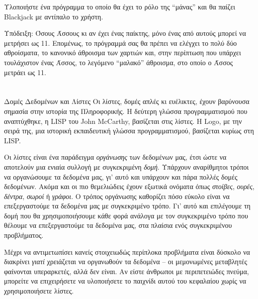 \documentclass[a4paper,11pt,oneside]{book}
\begin{document}
\begin{exercise}
Υλοποιήστε ένα πρόγραμμα το οποίο θα έχει το ρόλο της ``μάνας'' και θα παίζει Blackjack με αντίπαλο το χρήστη.

\begin{note}
Υπόδειξη: Όσους Άσσους κι αν έχει ένας παίκτης, μόνο ένας από αυτούς μπορεί να μετρήσει ως 11. Επομένως, το πρόγραμμά σας θα πρέπει να ελέγχει το πολύ δύο αθροίσματα, το κανονικό άθροισμα των χαρτιών και, στην περίπτωση που υπάρχει τουλάχιστον ένας Άσσος, το λεγόμενο ``μαλακό'' άθροισμα, στο οποίο ο Άσσος μετράει ως 11.
\end{note}
\end{exercise}


\section*{}
\vspace{2\parskip}
\hrulefill

\begin{theory}{Δομές Δεδομένων και Λίστες}
Οι λίστες, δομές απλές κι ευέλικτες, έχουν βαρύνουσα σημασία στην ιστορία της Πληροφορικής. Η δεύτερη γλώσσα προγραμματισμού που αναπτύχθηκε, η LISP του John McCarthy, βασίζεται στις λίστες. Η Logo, με την σειρά της, μια ιστορική εκπαιδευτική γλώσσα προγραμματισμού, βασίζεται κυρίως στη LISP.

Οι λίστες είναι ένα παράδειγμα \emph{οργάνωσης} των δεδομένων μας, έτσι ώστε να αποτελούν μια ενιαία συλλογή με συγκεκριμένη \emph{δομή}. Υπάρχουν αναρίθμητοι τρόποι να οργανώσουμε τα δεδομένα μας, γι' αυτό και υπάρχουν και πάρα πολλές δομές δεδομένων. Ακόμα και οι πιο θεμελιώδεις έχουν εξωτικά ονόματα όπως \emph{στοίβες}, \emph{ουρές}, \emph{δέντρα}, \emph{σωροί} ή \emph{γράφοι}. Ο τρόπος οργάνωσης καθορίζει πόσο εύκολο είναι να επεξεργαστούμε τα δεδομένα μας με συγκεκριμένο τρόπο. Γι' αυτό και επιλέγουμε τη δομή που θα χρησιμοποιήσουμε κάθε φορά ανάλογα με τον συγκεκριμένο τρόπο που θέλουμε να επεξεργαστούμε τα δεδομένα μας, στα πλαίσια ενός συγκεκριμένου προβλήματος.

Μέχρι να αντιμετωπίσει κανείς στοιχειωδώς περίπλοκα προβλήματα είναι δύσκολο να διακρίνει \emph{γιατί} χρειάζεται να οργανωθούν τα δεδομένα -- οι μεμονωμένες μεταβλητές φαίνονται υπεραρκετές, αλλά δεν είναι. Αν είστε άνθρωποι με περιπετειώδες πνεύμα, μπορείτε να επιχειρήσετε να υλοποιήσετε το παιχνίδι αυτού του κεφαλαίου χωρίς να χρησιμοποιήσετε λίστες.
\end{theory}
\end{document}
